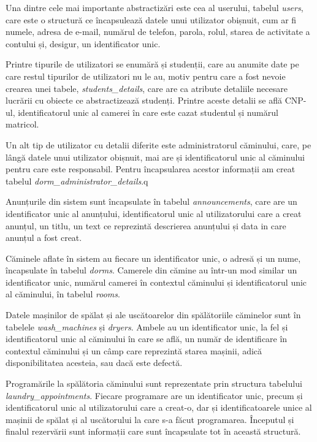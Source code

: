 \documentclass[12pt,a4paper]{report}
\theoremstyle{definition}
\theoremstyle{remark}
\begin{document}
\par Una dintre cele mai importante abstractizări este cea al userului, tabelul \textit{users}, care este o structură ce încapsulează datele unui utilizator obișnuit, cum ar fi numele, adresa de e-mail, numărul de telefon, parola, rolul, starea de activitate a contului și, desigur, un identificator unic.

\par Printre tipurile de utilizatori se enumără și studenții, care au anumite date pe care restul tipurilor de utilizatori nu le au, motiv pentru care a fost nevoie crearea unei tabele, \textit{students\_details}, care are ca atribute detaliile necesare lucrării cu obiecte ce abstractizează studenți. Printre aceste detalii se află CNP-ul, identificatorul unic al camerei în care este cazat studentul și numărul matricol.

\par Un alt tip de utilizator cu detalii diferite este administratorul căminului, care, pe lângă datele unui utilizator obișnuit, mai are și identificatorul unic al căminului pentru care este responsabil. Pentru încapsularea acestor informații am creat tabelul \textit{dorm\_administrator\_details}.q

\par Anunțurile din sistem sunt încapsulate în tabelul \textit{announcements}, care are un identificator unic al anunțului, identificatorul unic al utilizatorului care a creat anunțul, un titlu, un text ce reprezintă descrierea anunțului și data in care anunțul a fost creat.

\par Căminele aflate în sistem au fiecare un identificator unic, o adresă și un nume, încapsulate în tabelul \textit{dorms}. Camerele din cămine au într-un mod similar un identificator unic, numărul camerei în contextul căminului și identificatorul unic al căminului, în tabelul \textit{rooms}.

\par Datele mașinilor de spălat și ale uscătoarelor din spălătoriile căminelor sunt în tabelele \textit{wash\_machines} și \textit{dryers}. Ambele au un identificator unic, la fel și identificatorul unic al căminului în care se află, un număr de identificare în contextul căminului și un câmp care reprezintă starea mașinii, adică disponibilitatea acesteia, sau dacă este defectă.

\par Programările la spălătoria căminului sunt reprezentate prin structura tabelului \textit{laundry\_appointments}. Fiecare programare are un identificator unic, precum și identificatorul unic al utilizatorului care a creat-o, dar și identificatoarele unice al mașinii de spălat și al uscătorului la care s-a făcut programarea. Începutul și finalul rezervării sunt informații care sunt încapsulate tot în această structură.
\end{document}
